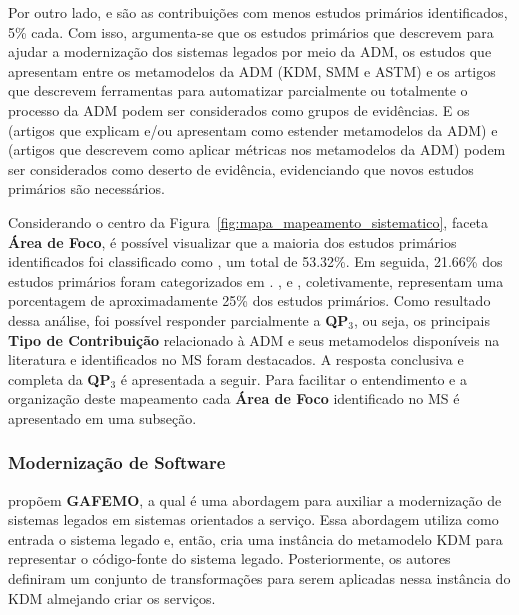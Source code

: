 Por outro lado,  e  são as contribuições com menos estudos primários identificados, 5\% cada. Com isso, argumenta-se que os estudos primários que descrevem  para ajudar a modernização dos sistemas legados por meio da ADM, os estudos que apresentam  entre os metamodelos da ADM (KDM, SMM e ASTM) e os artigos que descrevem ferramentas para automatizar parcialmente ou totalmente o processo da ADM podem ser considerados como grupos de evidências. E os  (artigos que explicam e/ou apresentam como estender metamodelos da ADM) e  (artigos que descrevem como aplicar métricas nos metamodelos da ADM) podem ser considerados como deserto de evidência, evidenciando que novos estudos primários são necessários.

Considerando o centro da Figura~\ref{fig:mapa_mapeamento_sistematico}, faceta \textbf{Área de Foco}, é possível visualizar que a maioria dos estudos primários identificados foi classificado como , um total de 53.32\%. Em seguida, 21.66\% dos estudos primários foram categorizados em . ,  e , coletivamente, representam uma porcentagem de aproximadamente 25\% dos estudos primários. Como resultado dessa análise, foi possível responder parcialmente a \textbf{QP$_3$}, ou seja, os principais \textbf{Tipo de Contribuição} relacionado à ADM e seus metamodelos disponíveis na literatura e identificados no MS foram destacados. A resposta conclusiva e completa da \textbf{QP$_3$} é apresentada a seguir. Para facilitar o entendimento e a organização deste mapeamento cada \textbf{Área de Foco} identificado no MS é apresentado em uma subseção.


\subsubsection{Modernização de Software} %
\label{ssub:approach}

 propõem \textbf{GAFEMO}, a qual é uma abordagem para auxiliar a modernização de sistemas legados em sistemas orientados a serviço. Essa abordagem utiliza como entrada o sistema legado e, então, cria uma instância do metamodelo KDM para representar o código-fonte do sistema legado. Posteriormente, os autores definiram um conjunto de transformações para serem aplicadas nessa instância do KDM almejando criar os serviços.


